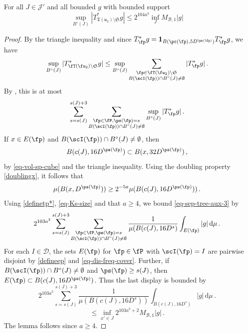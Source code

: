     \begin{lemma}
        \label{local-tree-control}
        \leanok
        For all $J \in \mathcal{J}'$ and all bounded $g$ with bounded support
        $$
            \sup_{B^\circ{}(J)} |T_{\mathfrak{T}(\mathfrak{u}_2)\setminus\mathfrak{S}}^* g| \le 2^{104a^3} \inf_J M_{\mathcal{B},1}|g|
        $$
    \end{lemma}

    \begin{proof}
        \leanok
        By the triangle inequality and since $T_{\fp}^* g = \mathbf{1}_{B(\pc(\fp), 5D^{\ps(\fp)})} T_{\fp}^* g$, we have
        $$
            \sup_{B^\circ{}(J)} |T_{\fT(\fu_2) \setminus\mathfrak{S}}^* g|
            \leq \sup_{B^\circ{}(J)} \sum_{\substack{\fp \in \fT(\fu_2) \setminus \mathfrak{S}\\ B(\scI(\fp)) \cap B^\circ(J) \ne \emptyset}} |T_{\fp}^*g|\,.
        $$
        By , this is at most
      \begin{equation}
            \label{eq-sep-tree-aux-3}
            \sum_{s = s(J)}^{s(J) + 3} \sum_{\substack{\fp \in \fP, \ps(\fp) = s\\ B(\scI(\fp)) \cap B^\circ(J) \ne \emptyset}} \sup_{B^\circ{}(J)} |T_{\fp}^* g|\,.
        \end{equation}
        If $x \in E(\fp)$ and $B(\scI(\fp)) \cap B^\circ(J) \ne \emptyset$, then
        $$
            B(c(J), 16D^{\ps(\fp)}) \subset B(x, 32 D^{\ps(\fp)})\,,
        $$
        by \eqref{eq-vol-sp-cube} and the triangle inequality. Using the doubling property \eqref{doublingx}, it follows that
        $$
            \mu(B(x, D^{\ps(\fp)})) \ge 2^{-5a} \mu(B(c(J), 16D^{\ps(\fp)}))\,.
        $$
        Using \eqref{definetp*}, \eqref{eq-Ks-size} and that $a \ge 4$, we bound \eqref{eq-sep-tree-aux-3} by
        $$
            2^{103a^3}\sum_{s = s(J)}^{s(J) + 3} \sum_{\substack{\fp \in \fP, \ps(\fp) = s\\B(\scI(\fp)) \cap B^\circ(J) \ne \emptyset}} \frac{1}{\mu(B(c(J), 16 D^s)} \int_{E(\fp)} |g| \, \mathrm{d}\mu\,.
        $$
        For each $I \in \mathcal{D}$, the sets $E(\fp)$ for $\fp \in \fP$ with $\scI(\fp) = I$ are pairwise disjoint by \eqref{defineep} and \eqref{eq-dis-freq-cover}.
        Further, if $B(\scI(\fp)) \cap B^\circ(J) \ne \emptyset$ and $\ps(\fp) \ge s(J)$, then $E(\fp) \subset B(c(J), 16 D^{\ps(\fp)})$. Thus the last display is bounded by
        $$
            2^{103a^3}\sum_{s = s(J)}^{s(J) + 3} \frac{1}{\mu(B(c(J), 16 D^s))} \int_{B(c(J), 16 D^s)} |g| \, \mathrm{d}\mu\,.
        $$
        $$
            \le \inf_{x' \in J} 2^{103a^3 +2} M_{\mathcal{B}, 1} |g|\,.
        $$
        The lemma follows since $a \ge 4$.
    \end{proof}

